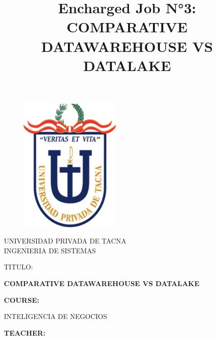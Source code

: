 \documentclass{article}
\begin{document}
\title{Encharged Job N°3: COMPARATIVE DATAWAREHOUSE VS DATALAKE}
\begin{titlepage}
\begin{figure}[htb]
\begin{center}
\includegraphics[width=5cm]{logo.png}
\end{center}
\end{figure}
\vspace*{-0.25in}
\begin{center}
\large{UNIVERSIDAD PRIVADA DE TACNA}\\
\vspace*{-0.025in}
INGENIERIA DE SISTEMAS  \\

\vspace*{0.5in}
\begin{large}
TITULO:\\
\end{large}

\vspace*{0.1in}
\begin{Large}
\textbf{COMPARATIVE DATAWAREHOUSE VS DATALAKE} \\
\end{Large}

\vspace*{0.3in}
\begin{Large}
\textbf{COURSE:} \\
\end{Large}

\vspace*{0.1in}
\begin{large}
INTELIGENCIA DE NEGOCIOS\\
\end{large}

\vspace*{0.3in}
\begin{Large}
\textbf{TEACHER:} \\
\end{Large}


\end{center}
\end{titlepage}
\end{document}
